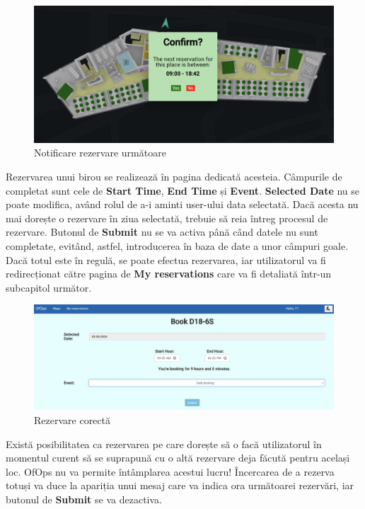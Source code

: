 \newpage

\begin{figure}[!htb]
    \centering
    \includegraphics[width=0.9\linewidth]{images/notif.png}
    \caption{Notificare rezervare următoare}
    \label{fig:notif }
\end{figure}

Rezervarea unui birou se realizează în pagina dedicată acesteia. Câmpurile de completat sunt cele de \textbf{Start Time}, \textbf{End Time} și \textbf{Event}. \textbf{Selected Date} nu se poate modifica, având rolul de a-i aminti user-ului data selectată. Dacă acesta nu mai dorește o rezervare în ziua selectată, trebuie să reia întreg procesul de rezervare. Butonul de \textbf{Submit} nu se va activa până când datele nu sunt completate, evitând, astfel, introducerea în baza de date a unor câmpuri goale. Dacă totul este în regulă, se poate efectua rezervarea, iar utilizatorul va fi redirecționat către pagina de \textbf{My reservations} care va fi detaliată într-un subcapitol următor.

\begin{figure}[!htb]
    \centering
    \includegraphics[width=0.9\linewidth]{images/rezerv corecta.png}
    \caption{Rezervare corectă}
    \label{fig:rezerv corecta }
\end{figure}

Există posibilitatea ca rezervarea pe care dorește să o facă utilizatorul în momentul curent să se suprapună cu o altă rezervare deja făcută pentru același loc. OfOps nu va permite întâmplarea acestui lucru! Încercarea de a rezerva totuși va duce la apariția unui mesaj care va indica ora următoarei rezervări, iar butonul de \textbf{Submit} se va dezactiva.

